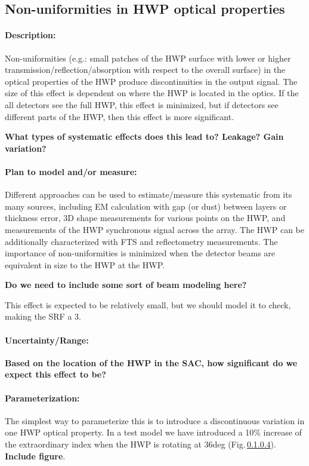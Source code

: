\subsection{Non-uniformities in HWP optical properties}

\paragraph{Description:}
Non-uniformities (e.g.: small patches of the HWP surface with lower or higher transmission/reflection/absorption with respect to the overall surface) in the optical properties of the HWP produce discontinuities in the output signal. The size of this effect is dependent on where the HWP is located in the optics. If the all detectors see the full HWP, this effect is minimized, but if detectors see different parts of the HWP, then this effect is more significant.

\textbf{What types of systematic effects does this lead to? Leakage? Gain variation?}



\paragraph{Plan to model and/or measure:}
Different approaches can be used to estimate/measure this systematic from its many sources, including EM calculation with gap (or dust) between layers or thickness error, 3D shape measurements for various points on the HWP, and measurements of the
HWP synchronous signal across the array. The HWP can be additionally characterized with FTS and reflectometry measurements. The importance of non-uniformities is minimized when the detector beams are equivalent in size to the HWP at the HWP.

\textbf{Do we need to include some sort of beam modeling here?}

This effect is expected to be relatively small, but we should model it to check, making the SRF a 3.

\paragraph{Uncertainty/Range:}
\textbf{Based on the location of the HWP in the SAC, how significant do we expect this effect to be?}

\paragraph{Parameterization:}
The simplest way to parameterize this is to introduce a discontinuous variation in one HWP optical property. In a test model we have introduced a 10$\%$ increase of the extraordinary index when the HWP
is rotating at 36deg (Fig.\,\ref{}). \textbf{Include figure}.

